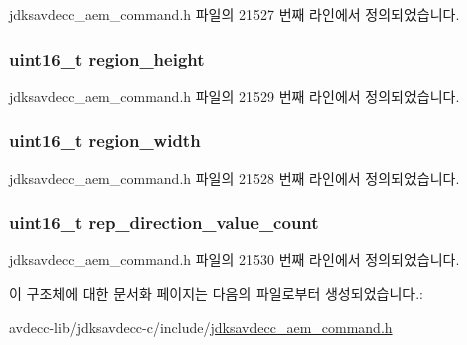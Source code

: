 jdksavdecc\+\_\+aem\+\_\+command.\+h 파일의 21527 번째 라인에서 정의되었습니다.

\subsubsection[{\texorpdfstring{region\+\_\+height}{region_height}}]{\setlength{\rightskip}{0pt plus 5cm}uint16\+\_\+t region\+\_\+height}\hypertarget{structjdksavdecc__aem__command__set__matrix_afac2ca21b44ee4f90b555f2609321c60}{}\label{structjdksavdecc__aem__command__set__matrix_afac2ca21b44ee4f90b555f2609321c60}


jdksavdecc\+\_\+aem\+\_\+command.\+h 파일의 21529 번째 라인에서 정의되었습니다.

\subsubsection[{\texorpdfstring{region\+\_\+width}{region_width}}]{\setlength{\rightskip}{0pt plus 5cm}uint16\+\_\+t region\+\_\+width}\hypertarget{structjdksavdecc__aem__command__set__matrix_a87453b735ebc871f58f507139df28b89}{}\label{structjdksavdecc__aem__command__set__matrix_a87453b735ebc871f58f507139df28b89}


jdksavdecc\+\_\+aem\+\_\+command.\+h 파일의 21528 번째 라인에서 정의되었습니다.

\subsubsection[{\texorpdfstring{rep\+\_\+direction\+\_\+value\+\_\+count}{rep_direction_value_count}}]{\setlength{\rightskip}{0pt plus 5cm}uint16\+\_\+t rep\+\_\+direction\+\_\+value\+\_\+count}\hypertarget{structjdksavdecc__aem__command__set__matrix_ad43e01e546f8431400084a400bc17c47}{}\label{structjdksavdecc__aem__command__set__matrix_ad43e01e546f8431400084a400bc17c47}


jdksavdecc\+\_\+aem\+\_\+command.\+h 파일의 21530 번째 라인에서 정의되었습니다.



이 구조체에 대한 문서화 페이지는 다음의 파일로부터 생성되었습니다.\+:\begin{DoxyCompactItemize}
\item 
avdecc-\/lib/jdksavdecc-\/c/include/\hyperlink{jdksavdecc__aem__command_8h}{jdksavdecc\+\_\+aem\+\_\+command.\+h}\end{DoxyCompactItemize}
